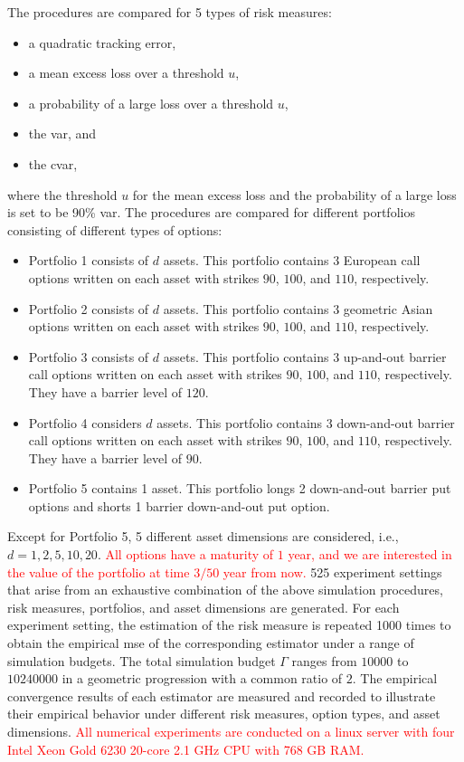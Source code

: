 The procedures are compared for 5 types of risk measures:
\begin{itemize}
    \item a quadratic tracking error,
    \item a mean excess loss over a threshold $u$,
    \item a probability of a large loss over a threshold $u$,
    \item the \gls{var}, and
    \item the \gls{cvar},
\end{itemize}
where the threshold $u$ for the mean excess loss and the probability of a large loss is set to be 90\% \gls{var}.
The procedures are compared for different portfolios consisting of different types of options:
\begin{itemize}
    \item   Portfolio 1 consists of $d$ assets.
    This portfolio contains 3 European call options written on each asset with strikes $90$, $100$, and $110$, respectively. 
    \item   Portfolio 2 consists of $d$ assets.
    This portfolio contains 3 geometric Asian options written on each asset with strikes $90$, $100$, and $110$, respectively. 
    \item   Portfolio 3 consists of $d$ assets.
    This portfolio contains 3 up-and-out barrier call options written on each asset with strikes $90$, $100$, and $110$, respectively. They have a barrier level of $120$.
    \item   Portfolio 4 considers $d$ assets.
    This portfolio contains 3 down-and-out barrier call options written on each asset with strikes $90$, $100$, and $110$, respectively. They have a barrier level of $90$.
    \item   Portfolio 5 contains 1 asset.
    This portfolio longs 2 down-and-out barrier put options and shorts 1 barrier down-and-out put option. 
\end{itemize}
Except for Portfolio 5, 5 different asset dimensions are considered, i.e., $d = 1, 2, 5, 10, 20$.
\textcolor{red}{All options have a maturity of $1$ year, and we are interested in the value of the portfolio at time $3/50$ year from now.}
525 experiment settings that arise from an exhaustive combination of the above simulation procedures, risk measures, portfolios, and asset dimensions are generated.
For each experiment setting, the estimation of the risk measure is repeated \num{1000} times to obtain the empirical \gls{mse} of the corresponding estimator under a range of simulation budgets.
The total simulation budget $\Gamma$ ranges from $\num{10000}$ to $\num{10240000}$ in a geometric progression with a common ratio of $2$.
The empirical convergence results of each estimator are measured and recorded to illustrate their empirical behavior under different risk measures, option types, and asset dimensions.
\textcolor{red}{All numerical experiments are conducted on a linux server with four Intel Xeon Gold 6230 20-core 2.1 GHz CPU with 768 GB RAM.}

